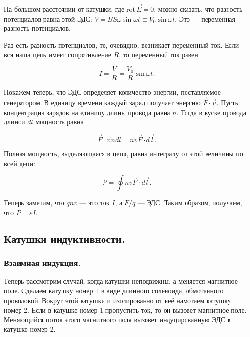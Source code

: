 \documentclass[11pt,a4paper]{article}
\numberwithin{equation}{section}
\newcommand{\rot}{\mathrm{rot}\,}
\newcommand{\vareps}{\varepsilon}
\begin{document}
На большом расстоянии от катушки, где $\rot \vec{E} =0$, можно
сказать, что разность потенциалов равна этой ЭДС: $V = B S \omega \sin
\omega t \equiv V_0 \sin \omega t$. Это --- переменная разность
потенциалов. 

Раз есть разность потенциалов, то, очевидно, возникает переменный
ток. Если вся наша цепь имеет сопротивление $R$, то переменный ток
равен

\begin{equation}
  \label{eq:generator_current}
  I = \frac{V}{R} = \frac{V_0}{R} \sin \omega t.
\end{equation}

Покажем теперь, что ЭДС определяет количество энергии, поставляемое
генератором. В единицу времени каждый заряд получает энергию $\vec{F}
\cdot \vec{v}$. Пусть концентрация зарядов на единицу длины провода
равна $n$. Тогда в куске провода длиной $dl$ мощность равна

\begin{equation}
  \label{eq:generator_power_1}
  \vec{F} \cdot \vec{v} n dl = nv \vec{F} \cdot d\vec{l}.
\end{equation}

Полная мощность, выделяющаяся в цепи, равна интегралу от этой
величины по всей цепи:

\begin{equation}
  \label{eq:generator_power_2}
  P = \oint nv \vec{F} \cdot d\vec{l}.
\end{equation}

Теперь заметим, что $qnv$ --- это ток $I$, а $F/q$ --- ЭДС. Таким
образом, получаем, что $P = \vareps I$.

\subsection{Катушки индуктивности.}
\label{sec:coil}

\subsubsection{Взаимная индукция.}
\label{sec:common_induction}

Теперь рассмотрим случай, когда катушки неподвижны, а меняется
магнитное поле. Сделаем катушку номер 1 в виде длинного соленоида,
обмотанного проволокой. Вокруг этой катушки и изолированно от неё
намотаем катушку номер 2. Если в катушке номер 1 пропустить ток, то он
вызовет магнитное поле. Меняющийся поток этого магнитного поля вызовет
индуцированную ЭДС в катушке номер 2. 
\end{document}
